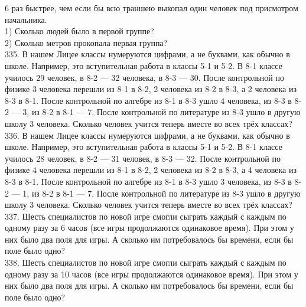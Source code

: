 6 раз быстрее, чем если бы всю траншею выкопал один человек под присмотром начальника.\\
1) Сколько людей было в первой группе?\\
2) Сколько метров прокопала первая группа?\\
335. В нашем Лицее классы нумеруются цифрами, а не буквами, как обычно в школе. Например, это вступительная работа в классы 5-1 и 5-2. В 8-1 классе училось 29 человек, в 8-2 --- 32 человека, в 8-3 --- 30. После контрольной по физике 3 человека перешли из 8-1 в 8-2, 2 человека из 8-2 в 8-3, а 2 человека из 8-3 в 8-1. После контрольной по алгебре из 8-1 в 8-3 ушло 4 человека, из 8-3 в 8-2 --- 3, из 8-2 в 8-1 --- 7. После контрольной по литературе из 8-3 ушло в другую школу 3 человека. Сколько человек учится теперь вместе во всех трёх классах?\\
336. В нашем Лицее классы нумеруются цифрами, а не буквами, как обычно в школе. Например, это вступительная работа в классы 5-1 и 5-2. В 8-1 классе училось 28 человек, в 8-2 --- 31 человек, в 8-3 --- 32. После контрольной по физике 4 человека перешли из 8-1 в 8-2, 2 человека из 8-2 в 8-3, а 4 человека из 8-3 в 8-1. После контрольной по алгебре из 8-1 в 8-3 ушло 3 человека, из 8-3 в 8-2 --- 1, из 8-2 в 8-1 --- 7. После контрольной по литературе из 8-3 ушло в другую школу 3 человека. Сколько человек учится теперь вместе во всех трёх классах?\\
337. Шесть специалистов по новой игре смогли сыграть каждый с каждым по одному разу за 6 часов (все игры продолжаются одинаковое время). При этом у них было два поля для игры. А сколько им потребовалось бы времени, если бы поле было одно?\\
338. Шесть специалистов по новой игре смогли сыграть каждый с каждым по одному разу за 10 часов (все игры продолжаются одинаковое время). При этом у них было два поля для игры. А сколько им потребовалось бы времени, если бы поле было одно?
\newpage
